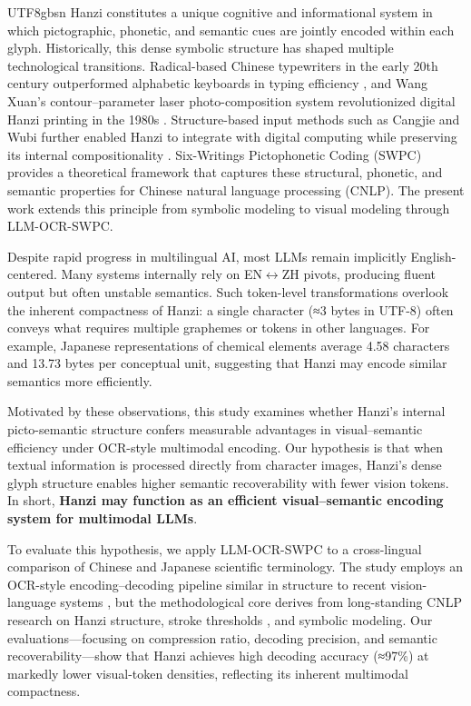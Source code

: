 \documentclass[conference]{IEEEtran}
\begin{document}
\begin{CJK*}{UTF8}{gbsn}
Hanzi constitutes a unique cognitive and informational system in which pictographic, phonetic, and semantic cues are jointly encoded within each glyph. Historically, this dense symbolic structure has shaped multiple technological transitions. Radical-based Chinese typewriters in the early 20th century outperformed alphabetic keyboards in typing efficiency \cite{mullaney2017chinese,weigang2022typewriter}, and Wang Xuan’s contour–parameter laser photo-composition system revolutionized digital Hanzi printing in the 1980s \cite{wangxuan1997}. Structure-based input methods such as Cangjie and Wubi further enabled Hanzi to integrate with digital computing while preserving its internal compositionality \cite{sun2021chinesebert,weigang2025threshold}. Six-Writings Pictophonetic Coding (SWPC) \cite{weigang2024six} provides a theoretical framework that captures these structural, phonetic, and semantic properties for Chinese natural language processing (CNLP). The present work extends this principle from symbolic modeling to visual modeling through LLM-OCR-SWPC.

Despite rapid progress in multilingual AI, most LLMs remain implicitly English-centered. Many systems internally rely on EN$\leftrightarrow$ZH pivots, producing fluent output but often unstable semantics. Such token-level transformations overlook the inherent compactness of Hanzi: a single character (≈3 bytes in UTF-8) often conveys what requires multiple graphemes or tokens in other languages. For example, Japanese representations of chemical elements average 4.58 characters and 13.73 bytes per conceptual unit, suggesting that Hanzi may encode similar semantics more efficiently.

Motivated by these observations, this study examines whether Hanzi’s internal picto-semantic structure confers measurable advantages in visual–semantic efficiency under OCR-style multimodal encoding. Our hypothesis is that when textual information is processed directly from character images, Hanzi’s dense glyph structure enables higher semantic recoverability with fewer vision tokens. In short, \textbf{Hanzi may function as an efficient visual–semantic encoding system for multimodal LLMs}.

To evaluate this hypothesis, we apply LLM-OCR-SWPC to a cross-lingual comparison of Chinese and Japanese scientific terminology. The study employs an OCR-style encoding–decoding pipeline similar in structure to recent vision-language systems \cite{wei2025deepseek}, but the methodological core derives from long-standing CNLP research on Hanzi structure, stroke thresholds \cite{weigang2025threshold}, and symbolic modeling. %
Our evaluations—focusing on compression ratio, decoding precision, and semantic recoverability—show that Hanzi achieves high decoding accuracy (≈97\%) at markedly lower visual-token densities, reflecting its inherent multimodal compactness.


\end{CJK*}
\end{document}
